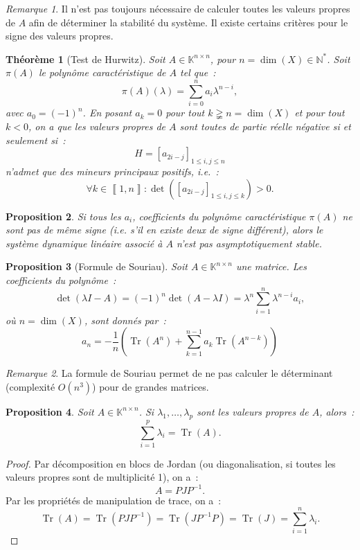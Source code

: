 \documentclass{article}
\newtheorem{thm}{Théorème}[section]
\newtheorem{prp}[thm]{Proposition}
\theoremstyle{definition}
\theoremstyle{remark}
\newtheorem*{rmq}{Remarque}
\DeclareMathOperator{\Tr}{Tr}
\newcommand{\N}{\mathbb N}
\newcommand{\K}{\mathbb K}
\newcommand{\intint}[2]{{\left\llbracket#1, #2\right\rrbracket}}
\begin{document}
	\begin{rmq} Il n'est pas toujours nécessaire de calculer toutes les valeurs propres de $A$ afin de déterminer la stabilité du système. Il existe certains
	critères pour le signe des valeurs propres.
	\end{rmq}

	\begin{thm}[Test de Hurwitz] Soit $A \in \K^{n \times n}$, pour $n = \dim(X) \in \N^*$. Soit $\pi(A)$ le polynôme caractéristique de $A$ tel que~:
	\[\pi(A)(\lambda) = \sum_{i=0}^na_i\lambda^{n-i},\]
	avec $a_0 = (-1)^n$. En posant $a_k = 0$ pour tout $k \gneqq n = \dim(X)$ et pour tout $k < 0$, on a que les valeurs propres de $A$ sont toutes de partie
	réelle négative si et seulement si~:
	\[H = [a_{2i-j}]_{1 \leq i,j \leq n}\]
	n'admet que des mineurs principaux positifs, i.e.~:
	\[\forall k \in \intint 1n : \det\left([a_{2i-j}]_{1 \leq i, j \leq k}\right) > 0.\]
	\end{thm}

	\begin{prp} Si tous les $a_i$, coefficients du polynôme caractéristique $\pi(A)$ ne sont pas de même signe (i.e. s'il en existe deux de signe différent),
	alors le système dynamique linéaire associé à $A$ n'est pas asymptotiquement stable.
	\end{prp}

	\begin{prp}[Formule de Souriau] Soit $A \in \K^{n \times n}$ une matrice. Les coefficients du polynôme~:
	\[\det(\lambda I - A) = (-1)^n\det(A - \lambda I) = \lambda^n\sum_{i=1}^n\lambda^{n-i}a_i,\]
	où $n = \dim(X)$, sont donnés par~:
	\[a_n = -\frac 1n\left(\Tr(A^n) + \sum_{k=1}^{n-1}a_k\Tr(A^{n-k})\right)\]
	\end{prp}

	\begin{rmq} La formule de Souriau permet de ne pas calculer le déterminant (complexité $O(n^3)$) pour de grandes matrices.
	\end{rmq}

	\begin{prp} Soit $A \in \K^{n \times n}$. Si $\lambda_1, \ldots, \lambda_p$ sont les valeurs propres de $A$, alors~:
	\[\sum_{i=1}^p\lambda_i = \Tr(A).\]
	\end{prp}

	\begin{proof} Par décomposition en blocs de Jordan (ou diagonalisation, si toutes les valeurs propres sont de multiplicité 1), on a~:
	\[A = PJP^{-1}.\]
	Par les propriétés de manipulation de trace, on a~:
	\[\Tr(A) = \Tr(PJP^{-1}) = \Tr(JP^{-1}P) = \Tr(J) = \sum_{i=1}^n\lambda_i.\]
	\end{proof}
\end{document}
